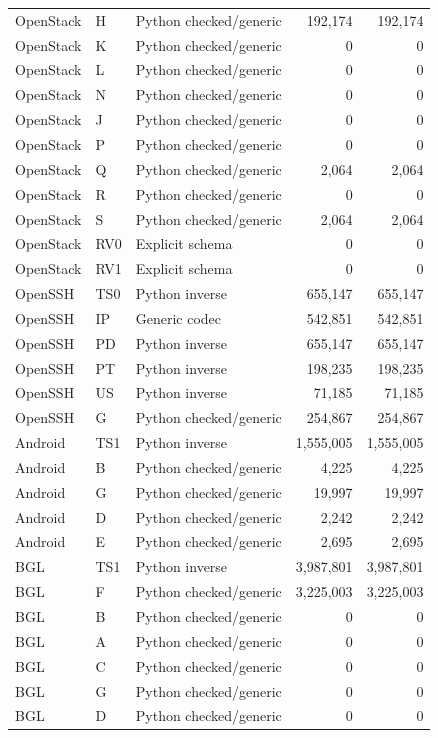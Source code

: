 \begin{longtable}{lllrr}
OpenStack & H & Python checked/generic & 192,174 & 192,174 \\
OpenStack & K & Python checked/generic & 0 & 0 \\
OpenStack & L & Python checked/generic & 0 & 0 \\
OpenStack & N & Python checked/generic & 0 & 0 \\
OpenStack & J & Python checked/generic & 0 & 0 \\
OpenStack & P & Python checked/generic & 0 & 0 \\
OpenStack & Q & Python checked/generic & 2,064 & 2,064 \\
OpenStack & R & Python checked/generic & 0 & 0 \\
OpenStack & S & Python checked/generic & 2,064 & 2,064 \\
OpenStack & RV0 & Explicit schema & 0 & 0 \\
OpenStack & RV1 & Explicit schema & 0 & 0 \\
OpenSSH & TS0 & Python inverse & 655,147 & 655,147 \\
OpenSSH & IP & Generic codec & 542,851 & 542,851 \\
OpenSSH & PD & Python inverse & 655,147 & 655,147 \\
OpenSSH & PT & Python inverse & 198,235 & 198,235 \\
OpenSSH & US & Python inverse & 71,185 & 71,185 \\
OpenSSH & G & Python checked/generic & 254,867 & 254,867 \\
Android & TS1 & Python inverse & 1,555,005 & 1,555,005 \\
Android & B & Python checked/generic & 4,225 & 4,225 \\
Android & G & Python checked/generic & 19,997 & 19,997 \\
Android & D & Python checked/generic & 2,242 & 2,242 \\
Android & E & Python checked/generic & 2,695 & 2,695 \\
BGL & TS1 & Python inverse & 3,987,801 & 3,987,801 \\
BGL & F & Python checked/generic & 3,225,003 & 3,225,003 \\
BGL & B & Python checked/generic & 0 & 0 \\
BGL & A & Python checked/generic & 0 & 0 \\
BGL & C & Python checked/generic & 0 & 0 \\
BGL & G & Python checked/generic & 0 & 0 \\
BGL & D & Python checked/generic & 0 & 0 \\

\end{longtable}
